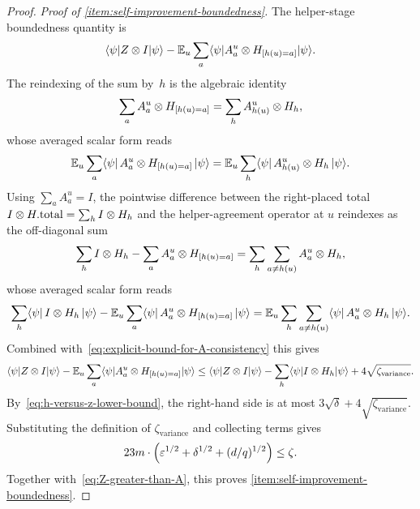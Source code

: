 \begin{proof}
  \emph{Proof of \ref{item:self-improvement-boundedness}.}
  The helper-stage boundedness quantity is
  \[
    \langle \psi \rvert Z \otimes I \lvert \psi \rangle -\mathbb{E}_{u} \sum_a \langle \psi \rvert  A^{u}_{a} \otimes H_{[h(u)=a]} \lvert \psi \rangle.
  \]
  The reindexing of the sum by~$h$ is the algebraic identity
  \[
    \sum_a A^u_a \otimes H_{[h(u)=a]} = \sum_h A^u_{h(u)} \otimes H_h,
  \]
  whose averaged scalar form reads
  \[
    \mathbb{E}_u \sum_a \langle \psi \rvert\,A^u_a \otimes H_{[h(u)=a]}\,\lvert \psi \rangle
      = \mathbb{E}_u \sum_h \langle \psi \rvert\,A^u_{h(u)} \otimes H_h\,\lvert \psi \rangle.
  \]
  Using $\sum_a A_a^u=I$, the pointwise difference between the right-placed
  total $I \otimes H.\mathrm{total} = \sum_h I \otimes H_h$ and the helper-agreement
  operator at $u$ reindexes as the off-diagonal sum
  \[
    \sum_h I \otimes H_h - \sum_a A^u_a \otimes H_{[h(u)=a]}
      = \sum_h \sum_{a \neq h(u)} A^u_a \otimes H_h,
  \]
  whose averaged scalar form reads
  \[
    \sum_h \langle \psi \rvert\,I \otimes H_h\,\lvert \psi \rangle
        - \mathbb{E}_u \sum_a \langle \psi \rvert\,A^u_a \otimes H_{[h(u)=a]}\,\lvert \psi \rangle
      = \mathbb{E}_u \sum_h \sum_{a \neq h(u)} \langle \psi \rvert\,A^u_a \otimes H_h\,\lvert \psi \rangle.
  \]
  Combined with~\eqref{eq:explicit-bound-for-A-consistency} this gives
  \[
    \langle \psi \rvert Z \otimes I \lvert \psi \rangle
    -\mathbb{E}_{u} \sum_a \langle \psi \rvert  A^{u}_{a} \otimes H_{[h(u)=a]} \lvert \psi \rangle
    \le \langle \psi \rvert Z \otimes I \lvert \psi \rangle - \sum_h \langle \psi \rvert I \otimes H_h \lvert \psi \rangle + 4 \sqrt{\zeta_{\mathrm{variance}}}.
  \]
  By~\eqref{eq:h-versus-z-lower-bound}, the right-hand side is at most $3\sqrt{\delta}+4\sqrt{\zeta_{\mathrm{variance}}}$. Substituting the definition of $\zeta_{\mathrm{variance}}$ and collecting terms gives
  \[
    23m\cdot\Big(\varepsilon^{1/2} + \delta^{1/2} + (d/q)^{1/2}\Big)
    \le \zeta.
  \]
  Together with~\eqref{eq:Z-greater-than-A}, this proves \ref{item:self-improvement-boundedness}.
\end{proof}

